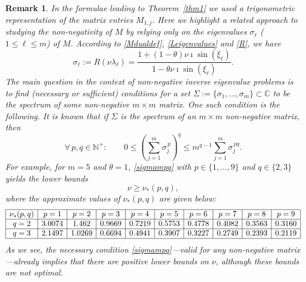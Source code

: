 \documentclass[a4paper]{article}
\newtheorem{remark}{Remark}
\newcommand{\te}{\theta}
\newcommand{\nplus}{\mathbb{N}^+}
\begin{document}
\begin{remark} 
In the formulae leading to Theorem~\ref{thm1} we used a trigonometric representation of the matrix
\emph{entries} $M_{1,j}$. Here we highlight a related approach to studying the non-negativity of $M$ by
relying only on the \emph{eigenvalues} $\sigma_\ell$ ($1\le \ell\le m$) of $M$. According to
\eqref{Mdualdef}, \eqref{Leigenvalues} and \eqref{R}, we have
\[
\sigma_\ell:=R(\nu\lambda_\ell)=\frac{1+ (1-\theta )\nu \imath \sin \left(\xi _\ell\right)}{1- \theta\nu \imath  \sin \left(\xi _\ell\right)}.
\]
The main question in the context of \emph{non-negative inverse eigenvalue problems} is to 
find (necessary or sufficient) conditions for a set $\Sigma:=\{\sigma_1,\ldots,\sigma_m\}\subset\mathbb{C}$ to be the spectrum of \emph{some} non-negative $m \times m$ matrix.
One such condition is the following. It is known \cite[Chapter 4]{nonnegmatr} that if $\Sigma$ is the spectrum of 
an $m \times m$ non-negative matrix, then 
\begin{equation}\label{sigmampq}
\forall\, p, q \in\nplus:\quad\quad 0\le \left(\sum_{j=1}^m \sigma_j^{\,p}\right)^q\le m^{q-1} \sum_{j=1}^m \sigma_j^{\,p q}.
\end{equation}
For example, for $m=5$ and $\te=1$, \eqref{sigmampq} with  $p\in\{1,\ldots,9\}$ and $q\in\{2,3\}$ yields the lower bounds
\begin{equation}\label{nustartpq}
\nu\ge \nu_{*}(p,q),
\end{equation}
where the approximate values of $\nu_{*}(p,q)$ are given below:
\[
\begin{array}{|c|c|c|c|c|c|c|c|c|c|}
\hline
\nu_{*}(p,q) & p=1 & p=2 & p=3 & p=4 & p=5 & p=6 & p=7 & p=8 & p=9 \\
\hline
q=2 & 3.0074 & 1.462 & 0.9669 & 0.7219 & 0.5753 & 0.4778 & 0.4082 & 0.3563 & 0.3160 \\
\hline
q=3 & 2.1497 & 1.0269 & 0.6694  & 0.4941 & 0.3907 & 0.3227  & 0.2749  & 0.2393  &  0.2119 \\
\hline
\end{array}
\]
As we see, the necessary condition \eqref{sigmampq}---valid for \emph{any} non-negative matrix---already 
implies that there are positive \emph{lower} bounds on $\nu$, although these bounds are not optimal. 

\end{remark}
\end{document}
